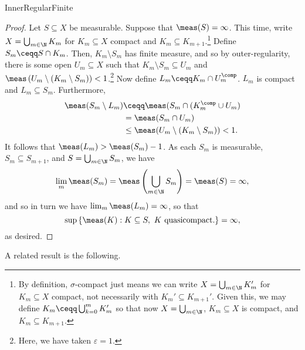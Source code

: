 \begin{prp}{}{InnerRegularFinite}
\begin{proof}
Let $S\subseteq X$ be measurable.  Suppose that $\meas (S)=\infty$.  This time, write $X=\bigcup _{m\in \N}K_m$ for $K_m\subseteq X$ compact and $K_m\subseteq K_{m+1}$.\footnote{By definition, $\sigma$-compact just means we can write $X=\bigcup _{m\in \N}K_m'$ for $K_m\subseteq X$ compact, not necessarily with $K_m'\subseteq K_{m+1}'$.  Given this, we may define $K_m\ceqq \bigcup _{k=0}^mK_m'$ so that now $X=\bigcup _{m\in \N}$, $K_m\subseteq X$ is compact, and $K_m\subseteq K_{m+1}$.}  Define $S_m\ceqq S\cap K_m$.  Then, $K_m\setminus S_m$ has finite measure, and so by outer-regularity, there is some open $U_m\subseteq X$ such that $K_m\setminus S_m\subseteq U_m$ and $\meas \left( U_m\setminus (K_m\setminus S_m)\right) <1$.\footnote{Here, we have taken $\varepsilon =1$.}  Now define $L_m\ceqq K_m\cap U_m^{\comp}$.  $L_m$ is compact and $L_m\subseteq S_m$.  Furthermore,
\begin{equation}
\begin{split}
\meas (S_m\setminus L_m) & \ceqq \meas (S_m\cap (K_m^{\comp}\cup U_m) \\
& =\meas (S_m\cap U_m) \\
& \leq \meas (U_m\setminus (K_m\setminus S_m))<1.
\end{split}
\end{equation}
It follows that $\meas (L_m)>\meas (S_m)-1$.   As each $S_m$ is measurable, $S_m\subseteq S_{m+1}$, and $S=\bigcup _{m\in \N}S_m$, we have
\begin{equation}
\lim _m\meas (S_m)=\meas \left( \bigcup _{m\in \N}S_m\right) =\meas (S)=\infty ,
\end{equation}
and so in turn we have $\lim _m\meas (L_m)=\infty$, so that
\begin{equation}
\sup \left\{ \meas (K):K\subseteq S,\ K\text{ quasicompact.}\right\} =\infty ,
\end{equation}
as desired.
\end{proof}
\end{prp}
A related result is the following.
